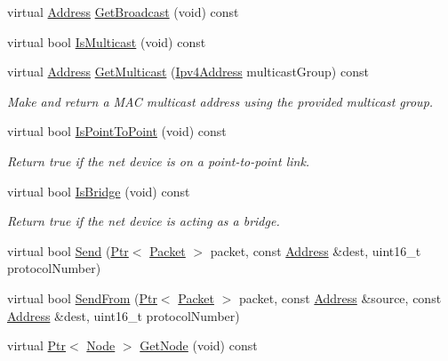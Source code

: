 \begin{DoxyCompactItemize}
\item 
virtual \hyperlink{classns3_1_1Address}{Address} \hyperlink{classns3_1_1SixLowPanNetDevice_a8555d52ad55cf6b2c57228c877ac4c0b}{Get\+Broadcast} (void) const 
\item 
virtual bool \hyperlink{classns3_1_1SixLowPanNetDevice_aadf6da2a7dd31391cd7feb3cb34d0b5e}{Is\+Multicast} (void) const 
\item 
virtual \hyperlink{classns3_1_1Address}{Address} \hyperlink{classns3_1_1SixLowPanNetDevice_a425fa29fb2baa8b0490c777beca71386}{Get\+Multicast} (\hyperlink{classns3_1_1Ipv4Address}{Ipv4\+Address} multicast\+Group) const 
\begin{DoxyCompactList}\small\item\em Make and return a M\+AC multicast address using the provided multicast group. \end{DoxyCompactList}\item 
virtual bool \hyperlink{classns3_1_1SixLowPanNetDevice_ad36487ecf68d99b8af03dc9afb8c469d}{Is\+Point\+To\+Point} (void) const 
\begin{DoxyCompactList}\small\item\em Return true if the net device is on a point-\/to-\/point link. \end{DoxyCompactList}\item 
virtual bool \hyperlink{classns3_1_1SixLowPanNetDevice_a8e826c5ee380ab40a0c609a096bd113d}{Is\+Bridge} (void) const 
\begin{DoxyCompactList}\small\item\em Return true if the net device is acting as a bridge. \end{DoxyCompactList}\item 
virtual bool \hyperlink{classns3_1_1SixLowPanNetDevice_a6566ae05fbc295d8cd22166b6b2c28ea}{Send} (\hyperlink{classns3_1_1Ptr}{Ptr}$<$ \hyperlink{classns3_1_1Packet}{Packet} $>$ packet, const \hyperlink{classns3_1_1Address}{Address} \&dest, uint16\+\_\+t protocol\+Number)
\item 
virtual bool \hyperlink{classns3_1_1SixLowPanNetDevice_aec79675091efa676370a4f9e6f4127e3}{Send\+From} (\hyperlink{classns3_1_1Ptr}{Ptr}$<$ \hyperlink{classns3_1_1Packet}{Packet} $>$ packet, const \hyperlink{classns3_1_1Address}{Address} \&source, const \hyperlink{classns3_1_1Address}{Address} \&dest, uint16\+\_\+t protocol\+Number)
\item 
virtual \hyperlink{classns3_1_1Ptr}{Ptr}$<$ \hyperlink{classns3_1_1Node}{Node} $>$ \hyperlink{classns3_1_1SixLowPanNetDevice_a8acf7abf8a8d9ff2ea2ff62e9a71a340}{Get\+Node} (void) const 

\end{DoxyCompactItemize}
